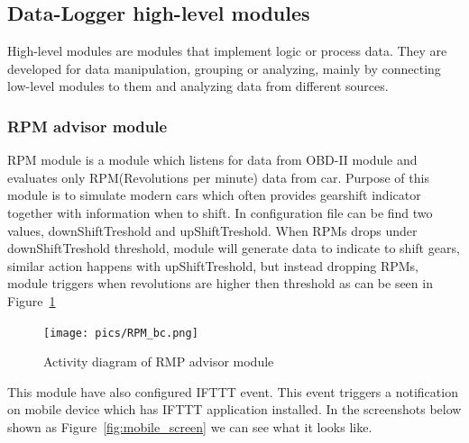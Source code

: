 \subsection{Data-Logger high-level modules}

High-level modules are modules that implement logic or process data. They are developed for data manipulation, grouping or analyzing, mainly by connecting low-level modules to them and analyzing data from different sources.
\subsubsection{RPM advisor module} %
\label{ssub:rpm_module}
RPM module is a module which listens for data from OBD-II module and evaluates only RPM(Revolutions per minute) data from car. Purpose of this module is to simulate modern cars which often provides gearshift indicator together with information when to shift. In configuration file can be find two values, downShiftTreshold and upShiftTreshold. When RPMs drops under downShiftTreshold threshold, module will generate data to indicate to shift gears, similar action happens with upShiftTreshold, but instead dropping RPMs, module triggers when revolutions are higher then threshold as can be seen in Figure~\ref{fig:rmp_pic}
\begin{figure}[H]
\begin{center}
\captionsetup{font=small}
\texttt{[image: pics/RPM\_bc.png]}
\caption{Activity diagram of RMP advisor module}
\label{fig:rmp_pic}
\end{center}
\end{figure}
This module have also configured IFTTT event. This event triggers a notification on mobile device which has IFTTT application installed. In the screenshots below shown as Figure~\ref{fig:mobile_screen} we can see what it looks like.
